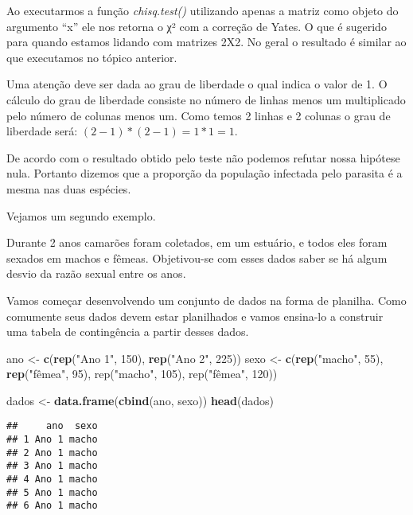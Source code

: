 \documentclass[]{book}
\newenvironment{Shaded}{\begin{snugshade}}{\end{snugshade}}
\newcommand{\DecValTok}[1]{\textcolor[rgb]{0.00,0.00,0.81}{#1}}
\newcommand{\KeywordTok}[1]{\textcolor[rgb]{0.13,0.29,0.53}{\textbf{#1}}}
\newcommand{\NormalTok}[1]{#1}
\newcommand{\StringTok}[1]{\textcolor[rgb]{0.31,0.60,0.02}{#1}}
\begin{document}
Ao executarmos a função \emph{chisq.test()} utilizando apenas a matriz como objeto do argumento ``x'' ele nos retorna o χ² com a correção de Yates. O que é sugerido para quando estamos lidando com matrizes 2X2. No geral o resultado é similar ao que executamos no tópico anterior.

Uma atenção deve ser dada ao grau de liberdade o qual indica o valor de 1. O cálculo do grau de liberdade consiste no número de linhas menos um multiplicado pelo número de colunas menos um. Como temos 2 linhas e 2 colunas o grau de liberdade será: \((2-1)*(2-1) = 1*1 = 1\).

De acordo com o resultado obtido pelo teste não podemos refutar nossa hipótese nula. Portanto dizemos que a proporção da população infectada pelo parasita é a mesma nas duas espécies.

Vejamos um segundo exemplo.

Durante 2 anos camarões foram coletados, em um estuário, e todos eles foram sexados em machos e fêmeas. Objetivou-se com esses dados saber se há algum desvio da razão sexual entre os anos.

Vamos começar desenvolvendo um conjunto de dados na forma de planilha. Como comumente seus dados devem estar planilhados e vamos ensina-lo a construir uma tabela de contingência a partir desses dados.

\begin{Shaded}
\begin{Highlighting}[]
\NormalTok{ano <-}\StringTok{ }\KeywordTok{c}\NormalTok{(}\KeywordTok{rep}\NormalTok{(}\StringTok{"Ano 1"}\NormalTok{, }\DecValTok{150}\NormalTok{), }\KeywordTok{rep}\NormalTok{(}\StringTok{"Ano 2"}\NormalTok{, }\DecValTok{225}\NormalTok{))}
\NormalTok{sexo <-}\StringTok{ }\KeywordTok{c}\NormalTok{(}\KeywordTok{rep}\NormalTok{(}\StringTok{"macho"}\NormalTok{, }\DecValTok{55}\NormalTok{), }\KeywordTok{rep}\NormalTok{(}\StringTok{"fêmea", 95), rep("}\NormalTok{macho}\StringTok{", 105), rep("}\NormalTok{fêmea", }\DecValTok{120}\NormalTok{))}

\NormalTok{dados <-}\StringTok{ }\KeywordTok{data.frame}\NormalTok{(}\KeywordTok{cbind}\NormalTok{(ano, sexo))}
\KeywordTok{head}\NormalTok{(dados)}
\end{Highlighting}
\end{Shaded}

\begin{verbatim}
##     ano  sexo
## 1 Ano 1 macho
## 2 Ano 1 macho
## 3 Ano 1 macho
## 4 Ano 1 macho
## 5 Ano 1 macho
## 6 Ano 1 macho
\end{verbatim}
\end{document}
